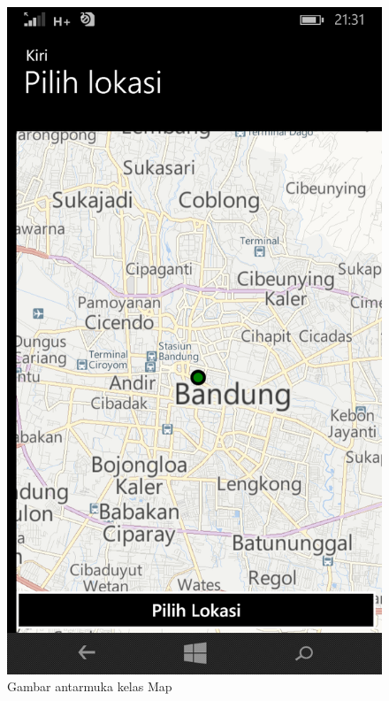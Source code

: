 	\begin{figure}[!h]
		\centering
			\includegraphics[scale=0.2]{Gambar/antarmuka/map}
		\caption{Gambar antarmuka kelas Map}
		\label{fig:antarmuka Map}
	\end{figure}
	
